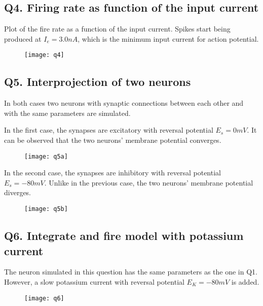 \documentclass[DIV=calc, paper=a4, fontsize=12pt, twocolumn]{article}	 %
\begin{document}
	\subsection*{Q4. Firing rate as function of the input current}
	Plot of the fire rate as a function of the input current. Spikes start being produced at $I_e = 3.0 nA$, which is the minimum input current for action potential.
		\begin{figure}[H]
			\texttt{[image: q4]}
		\end{figure}
		
	\vfill
	\subsection*{Q5. Interprojection of two neurons}
	In both cases two neurons with synaptic connections between each other and with the same parameters are simulated. 
	\par 
	In the first case, the synapses are excitatory with reversal potential $E_s = 0 mV$. It can be observed that the two neurons' membrane potential converges.
		\begin{figure}[H]
			\texttt{[image: q5a]}
		\end{figure}
	In the second case, the synapses are inhibitory with reversal potential $E_s = -80 mV$. Unlike in the previous case, the two neurons' membrane potential diverges.
		\begin{figure}[H]
			\texttt{[image: q5b]}
		\end{figure}
	\vfill
	\eject
	\subsection*{Q6. Integrate and fire model with potassium current}
	The neuron simulated in this question has the same parameters as the one in Q1. However, a slow potassium current with reversal potential $E_K = -80mV$ is added.
	\par
		\begin{figure}[htb]
			\texttt{[image: q6]} 
		\end{figure}
	
	
\end{document}
